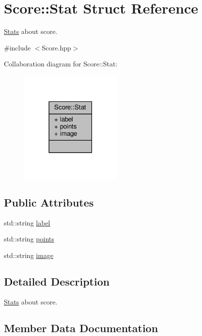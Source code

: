 \hypertarget{struct_score_1_1_stat}{}\section{Score\+:\+:Stat Struct Reference}
\label{struct_score_1_1_stat}


\hyperlink{class_stats}{Stats} about score.  




{\ttfamily \#include $<$Score.\+hpp$>$}



Collaboration diagram for Score\+:\+:Stat\+:
\nopagebreak
\begin{figure}[H]
\begin{center}
\leavevmode
\includegraphics[width=146pt]{struct_score_1_1_stat__coll__graph}
\end{center}
\end{figure}
\subsection*{Public Attributes}
\begin{DoxyCompactItemize}
\item 
std\+::string \hyperlink{struct_score_1_1_stat_a0ffe53744dc7681868907a1ba686f9a2}{label}
\item 
std\+::string \hyperlink{struct_score_1_1_stat_a5772fc05f54c1d2848f115db69a04720}{points}
\item 
std\+::string \hyperlink{struct_score_1_1_stat_a0a30fa63ef2f2e29207342d73c336232}{image}
\end{DoxyCompactItemize}


\subsection{Detailed Description}
\hyperlink{class_stats}{Stats} about score. 

\subsection{Member Data Documentation}
\mbox{\label{struct_score_1_1_stat_a0a30fa63ef2f2e29207342d73c336232}} 

